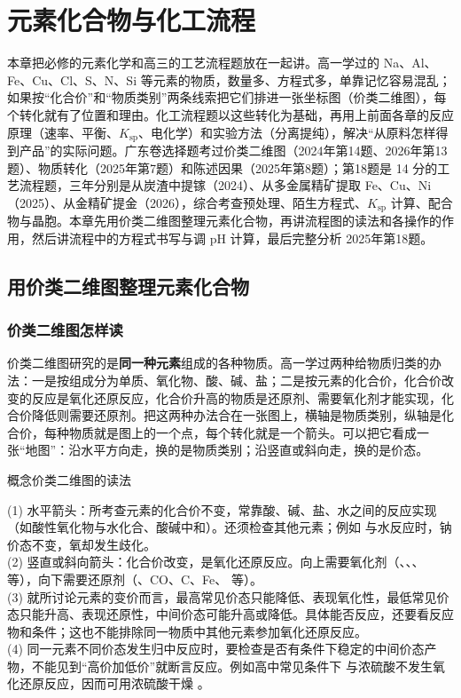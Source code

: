\documentclass[UTF8,a4paper,zihao=5,oneside,openany,fontset=none]{ctexbook}
\def\heiti{\CJKfamily{zhhei}}
\newcommand{\textheading}[2]{\par\addvspace{.6em}\Needspace{4\baselineskip}\noindent
 {\heiti\if\relax\detokenize{#2}\relax #1\else #2\fi}\par\nobreak\smallskip\nobreak\color{black}\ignorespaces}
\newenvironment{gainian}[1][]{\textheading{概念}{#1}}{\par\smallskip}
\begin{document}
\chapter{元素化合物与化工流程}

本章把必修的元素化学和高三的工艺流程题放在一起讲。高一学过的 Na、Al、Fe、Cu、Cl、S、N、Si 等元素的物质，数量多、方程式多，单靠记忆容易混乱；如果按“化合价”和“物质类别”两条线索把它们排进一张坐标图（价类二维图），每个转化就有了位置和理由。化工流程题以这些转化为基础，再用上前面各章的反应原理（速率、平衡、$K_\text{sp}$、电化学）和实验方法（分离提纯），解决“从原料怎样得到产品”的实际问题。广东卷选择题考过价类二维图（2024年第14题、2026年第13题）、物质转化（2025年第7题）和陈述因果（2025年第8题）；第18题是 14 分的工艺流程题，三年分别是从炭渣中提镓（2024）、从多金属精矿提取 Fe、Cu、Ni（2025）、从金精矿提金（2026），综合考查预处理、陌生方程式、$K_\text{sp}$ 计算、配合物与晶胞。本章先用价类二维图整理元素化合物，再讲流程图的读法和各操作的作用，然后讲流程中的方程式书写与调 pH 计算，最后完整分析 2025年第18题。

\section{用价类二维图整理元素化合物}

\subsection{价类二维图怎样读}
价类二维图研究的是\textbf{同一种元素}组成的各种物质。高一学过两种给物质归类的办法：一是按组成分为单质、氧化物、酸、碱、盐；二是按元素的化合价，化合价改变的反应是氧化还原反应，化合价升高的物质是还原剂、需要氧化剂才能实现，化合价降低则需要还原剂。把这两种办法合在一张图上，横轴是物质类别，纵轴是化合价，每种物质就是图上的一个点，每个转化就是一个箭头。可以把它看成一张“地图”：沿水平方向走，换的是物质类别；沿竖直或斜向走，换的是价态。

\begin{gainian}[价类二维图的读法]
(1) 水平箭头：所考查元素的化合价不变，常靠酸、碱、盐、水之间的反应实现（如酸性氧化物与水化合、酸碱中和）。还须检查其他元素；例如  与水反应时，钠价态不变，氧却发生歧化。\\
(2) 竖直或斜向箭头：化合价改变，是氧化还原反应。向上需要氧化剂（、、、 等），向下需要还原剂（、CO、C、Fe、 等）。\\
(3) 就所讨论元素的变价而言，最高常见价态只能降低、表现氧化性，最低常见价态只能升高、表现还原性，中间价态可能升高或降低。具体能否反应，还要看反应物和条件；这也不能排除同一物质中其他元素参加氧化还原反应。\\
(4) 同一元素不同价态发生归中反应时，要检查是否有条件下稳定的中间价态产物，不能见到“高价加低价”就断言反应。例如高中常见条件下  与浓硫酸不发生氧化还原反应，因而可用浓硫酸干燥 。
\end{gainian}
\end{document}

